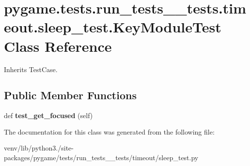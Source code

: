 \hypertarget{classpygame_1_1tests_1_1run__tests____tests_1_1timeout_1_1sleep__test_1_1_key_module_test}{}\section{pygame.\+tests.\+run\+\_\+tests\+\_\+\+\_\+tests.\+timeout.\+sleep\+\_\+test.\+Key\+Module\+Test Class Reference}
\label{classpygame_1_1tests_1_1run__tests____tests_1_1timeout_1_1sleep__test_1_1_key_module_test}


Inherits Test\+Case.

\subsection*{Public Member Functions}
\begin{DoxyCompactItemize}
\item 
\mbox{\label{classpygame_1_1tests_1_1run__tests____tests_1_1timeout_1_1sleep__test_1_1_key_module_test_aefcb2848df5657a9915729e5c78a04d3}} 
def {\bfseries test\+\_\+get\+\_\+focused} (self)
\end{DoxyCompactItemize}


The documentation for this class was generated from the following file\+:\begin{DoxyCompactItemize}
\item 
venv/lib/python3./site-\/packages/pygame/tests/run\+\_\+tests\+\_\+\+\_\+tests/timeout/sleep\+\_\+test.\+py\end{DoxyCompactItemize}
